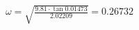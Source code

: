 \documentclass[preview]{standalone}
\begin{document}
\begin{align*}
\omega=\sqrt{\frac{9.81\cdot\tan{0.01473}}{2.02209}}=0.26732
\end{align*}
\end{document}
